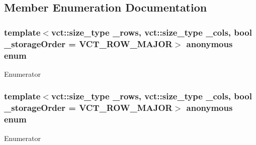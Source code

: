 \subsection{Member Enumeration Documentation}
\hypertarget{classnmr_s_v_d_fixed_size_data_afde2fde1248ef26d1678126978dff95e}{\subsubsection[{anonymous enum}]{\setlength{\rightskip}{0pt plus 5cm}template$<$vct\-::size\-\_\-type \-\_\-rows, vct\-::size\-\_\-type \-\_\-cols, bool \-\_\-storage\-Order = V\-C\-T\-\_\-\-R\-O\-W\-\_\-\-M\-A\-J\-O\-R$>$ anonymous enum}}\label{classnmr_s_v_d_fixed_size_data_afde2fde1248ef26d1678126978dff95e}
\begin{Desc}
\item[Enumerator]\par
\begin{description}
\item[{\em 
\hypertarget{classnmr_s_v_d_fixed_size_data_afde2fde1248ef26d1678126978dff95eac4be81b1cc6f6d12232a22300cc4c180}{M}\label{classnmr_s_v_d_fixed_size_data_afde2fde1248ef26d1678126978dff95eac4be81b1cc6f6d12232a22300cc4c180}
}]\end{description}
\end{Desc}
\hypertarget{classnmr_s_v_d_fixed_size_data_acd97aa1b3e1cc59cd68d90ae12060134}{\subsubsection[{anonymous enum}]{\setlength{\rightskip}{0pt plus 5cm}template$<$vct\-::size\-\_\-type \-\_\-rows, vct\-::size\-\_\-type \-\_\-cols, bool \-\_\-storage\-Order = V\-C\-T\-\_\-\-R\-O\-W\-\_\-\-M\-A\-J\-O\-R$>$ anonymous enum}}\label{classnmr_s_v_d_fixed_size_data_acd97aa1b3e1cc59cd68d90ae12060134}
\begin{Desc}
\item[Enumerator]\par
\begin{description}
\item[{\em 
\hypertarget{classnmr_s_v_d_fixed_size_data_acd97aa1b3e1cc59cd68d90ae12060134a017d2b71061eea6ea68ce5346c3bc89c}{N}\label{classnmr_s_v_d_fixed_size_data_acd97aa1b3e1cc59cd68d90ae12060134a017d2b71061eea6ea68ce5346c3bc89c}
}]\end{description}
\end{Desc}

